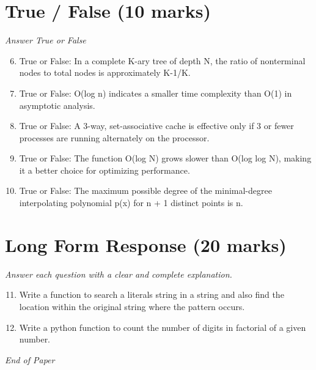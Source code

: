 \documentclass[12pt]{article}
\begin{document}
\section*{True / False (10 marks)}
\textit{Answer True or False}
\begin{enumerate}[label=\arabic*.]
\setcounter{enumi}{5}
\item True or False: In a complete K-ary tree of depth N, the ratio of nonterminal nodes to total nodes is approximately K-1/K.
\item True or False: O(log n) indicates a smaller time complexity than O(1) in asymptotic analysis.
\item True or False: A 3-way, set-associative cache is effective only if 3 or fewer processes are running alternately on the processor.
\item True or False: The function O(log N) grows slower than O(log log N), making it a better choice for optimizing performance.
\item True or False: The maximum possible degree of the minimal-degree interpolating polynomial p(x) for n + 1 distinct points is n.
\end{enumerate}

\section*{Long Form Response (20 marks)}
\textit{Answer each question with a clear and complete explanation.}
\begin{enumerate}[label=\arabic*.]
\setcounter{enumi}{10}
\item Write a function to search a literals string in a string and also find the location within the original string where the pattern occurs.
\item Write a python function to count the number of digits in factorial of a given number.
\end{enumerate}

\vfill
\noindent\textit{End of Paper}
\end{document}
